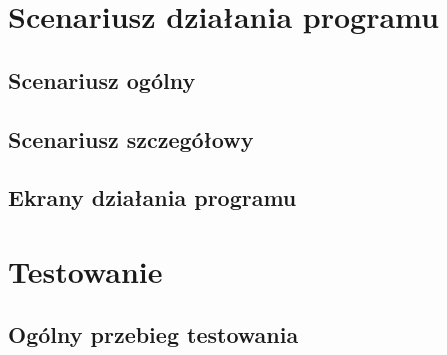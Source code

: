 \documentclass[]{article}
\begin{document}
\section{Scenariusz działania programu}
\subsection{Scenariusz ogólny} %
\subsection{Scenariusz szczegółowy} %
\subsection{Ekrany działania programu} %


\section{Testowanie}
\subsection{Ogólny przebieg testowania} %
\end{document}
